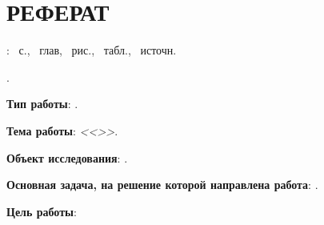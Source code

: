 \chapter*{РЕФЕРАТ}
\doctype: ~с., ~глав, ~рис., ~табл., ~источн.%

\vspace{3mm}

\MakeUppercase{\keywordsru}.

\Preface

\textbf{Тип работы}: \doctype.

\textbf{Тема работы}: \textit{<<\Title>>}.

\textbf{Объект исследования}: \ObjectOfResearch.

\textbf{Основная задача, на решение которой направлена работа}: \MainProblemOfResearch.

\textbf{Цель работы}: \GoalOfResearch

\SubtasksPerformed


